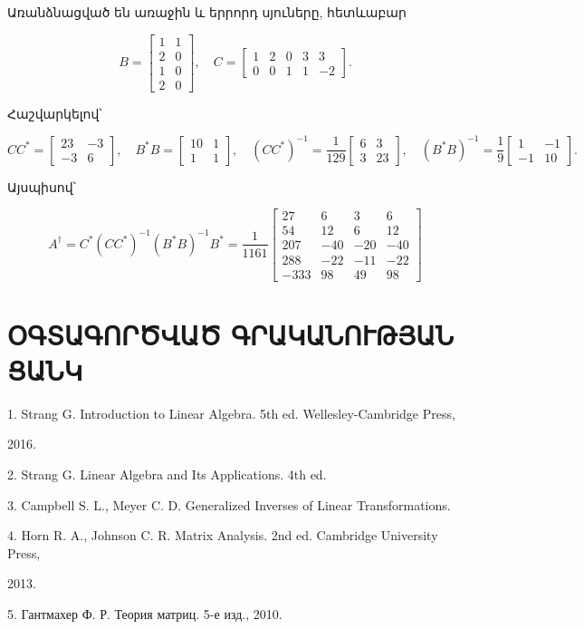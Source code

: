 \documentclass[11pt,a4paper]{article}
\begin{document}
Առանձնացված են առաջին և երրորդ սյուները, հետևաբար



\[B=\begin{bmatrix}1&1\\2&0\\1&0\\2&0\end{bmatrix},\quad C=\begin{bmatrix}1&2&0&3&3\\0&0&1&1&-2\end{bmatrix}.\]


Հաշվարկելով՝



\[CC^*=\begin{bmatrix}23&-3\\-3&6\end{bmatrix},\quad B^*B=\begin{bmatrix}10&1\\1&1\end{bmatrix},\quad (CC^*)^{-1}=\frac1{129}\begin{bmatrix}6&3\\3&23\end{bmatrix},\quad (B^*B)^{-1}=\frac19\begin{bmatrix}1&-1\\-1&10\end{bmatrix}.\]


Այսպիսով՝



\[\boxed{A^{\dagger}=C^*(CC^*)^{-1}(B^*B)^{-1}B^*=\frac1{1161}\begin{bmatrix}27&6&3&6\\54&12&6&12\\207&-40&-20&-40\\288&-22&-11&-22\\-333&98&49&98\end{bmatrix}}\]





\clearpage\section*{ՕԳՏԱԳՈՐԾՎԱԾ ԳՐԱԿԱՆՈՒԹՅԱՆ ՑԱՆԿ}

1. Strang G. Introduction to Linear Algebra. 5th ed. Wellesley-Cambridge Press,

2016.

2. Strang G. Linear Algebra and Its Applications. 4th ed.

3. Campbell S. L., Meyer C. D. Generalized Inverses of Linear Transformations.

4. Horn R. A., Johnson C. R. Matrix Analysis. 2nd ed. Cambridge University Press,

2013.

5. Гантмахер Ф. Р. Теория матриц. 5-е изд., 2010.
\end{document}
